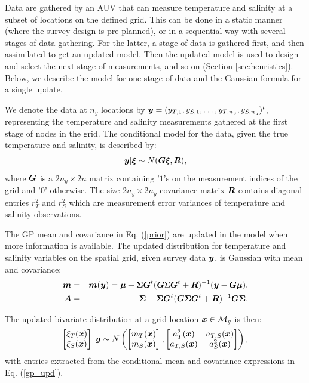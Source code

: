 \documentclass[aoas]{imsart}
\begin{document}
Data are gathered by an AUV that can measure temperature and salinity
at a subset of locations on the defined grid. This can be done in a
static manner (where the survey design is pre-planned), or in a
sequential way with several stages of data gathering. For the latter,
a stage of data is gathered first, and then assimilated to get an
updated model. Then the updated model is used to design and select the
next stage of measurements, and so on (Section
\ref{sec:heuristics}). Below, we describe the model for one stage of
data and the Gaussian formula for a single update.

We denote the data at $n_y$ locations by
${\boldsymbol y}=(y_{T,1},y_{S,1},\ldots,y_{T,n_y},y_{S,n_y})^t$, representing the
temperature and salinity measurements gathered at the first stage of
nodes in the grid. The conditional model for the data, given the true temperature
and salinity, is described by: 
\begin{equation}\label{likelihood}
\by | \bxi \sim N( \bG \bxi, \bR), %
\end{equation}
where ${\boldsymbol G}$ is a $2n_y \times 2n$ matrix containing '$1$'s on the
measurement indices of the grid and '$0$' otherwise. The size
$2n_y \times 2n_y$ covariance matrix ${\boldsymbol R}$ contains diagonal entries
$r^2_T$ and $r^2_S$ which are measurement error variances of
temperature and salinity observations.

The GP mean and covariance in Eq. (\ref{prior}) are updated in the
model when more information is available. The updated distribution for
temperature and salinity variables on the spatial grid, given survey
data ${\boldsymbol y}$, is Gaussian with mean and covariance:
\begin{eqnarray}\label{gp_upd}
  \bm &=& \bm(\by) = \bmu+\bSigma \bG^t (\bG \Sigma \bG^t+\bR)^{-1}(\by-\bG \bmu),  \\
  \bA &=& \bSigma - \bSigma \bG^t (\bG \bSigma \bG^t+\bR)^{-1} \bG
          \bSigma.\nonumber
\end{eqnarray}

The updated bivariate distribution at a grid location ${\boldsymbol x} \in
\mathcal{M}_g$ is then: 
\begin{equation}\label{gp_hat}
\begin{bmatrix}
\xi_T(\bx) \\
\xi_S(\bx)
\end{bmatrix}
 |\by
 \sim N \left( 
\begin{bmatrix} m_{T}(\bx)\\
m_{S}(\bx)
\end{bmatrix},\begin{bmatrix}
a_{T}^2(\bx) & a_{T,S}(\bx)  \\
a_{T,S}(\bx)  & a_{S}^2(\bx)  
\end{bmatrix}
\right),
\end{equation}
with entries extracted from the conditional mean and covariance
expressions in Eq. (\ref{gp_upd}).
\end{document}
